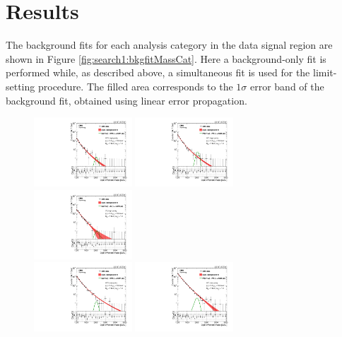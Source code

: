 \clearpage

\section{Results}
\label{sec:searchI:results}
The background fits for each analysis category in the data signal region are shown in Figure \ref{fig:search1:bkgfitMassCat}. Here a background-only fit is performed while, as described above, a simultaneous fit is used for the limit-setting procedure. The filled area corresponds to the $1 \sigma$ error band of the background fit, obtained using linear error propagation.
\begin{figure}[h!]
\centering
\includegraphics[width=0.327\textwidth]{figures/analysis/search1/AN-15-211/fits/MLfits/BkgFit_DijetMassHighPuriWW.pdf}
\includegraphics[width=0.327\textwidth]{figures/analysis/search1/AN-15-211/fits/MLfits/BkgFit_DijetMassHighPuriWZ.pdf}
\includegraphics[width=0.327\textwidth]{figures/analysis/search1/AN-15-211/fits/MLfits/BkgFit_DijetMassHighPuriZZ.pdf}\\
\includegraphics[width=0.327\textwidth]{figures/analysis/search1/AN-15-211/fits/MLfits/BkgFit_DijetMassLowPuriWW.pdf}
\includegraphics[width=0.327\textwidth]{figures/analysis/search1/AN-15-211/fits/MLfits/BkgFit_DijetMassLowPuriWZ.pdf}

\end{figure}
